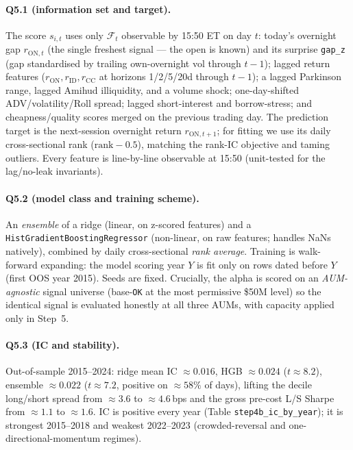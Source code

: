 \documentclass[11pt,a4paper]{article}
\newcommand{\code}[1]{\texttt{#1}}
\newcommand{\icBase}{0.016}
\newcommand{\icHGB}{0.024}
\newcommand{\icEns}{0.022}
\newcommand{\icEnsT}{7.2}
\newcommand{\spreadEns}{4.6}
\begin{document}
\paragraph{Q5.1 (information set and target).} The score $s_{i,t}$ uses only $\mathcal{F}_t$ observable by
15:50 ET on day $t$: today's overnight gap $r_{\mathrm{ON},t}$ (the single freshest signal --- the open is
known) and its surprise \code{gap\_z} (gap standardised by trailing own-overnight vol through $t{-}1$); lagged
return features ($r_{\mathrm{ON}},r_{\mathrm{ID}},r_{\mathrm{CC}}$ at horizons 1/2/5/20d through $t{-}1$); a
lagged Parkinson range, lagged Amihud illiquidity, and a volume shock; one-day-shifted ADV/volatility/Roll
spread; lagged short-interest and borrow-stress; and cheapness/quality scores merged on the previous trading
day. The prediction target is the next-session overnight return $r_{\mathrm{ON},t+1}$; for fitting we use its
daily cross-sectional rank ($\mathrm{rank}-0.5$), matching the rank-IC objective and taming outliers. Every
feature is line-by-line observable at 15:50 (unit-tested for the lag/no-leak invariants).

\paragraph{Q5.2 (model class and training scheme).} An \emph{ensemble} of a ridge (linear, on z-scored
features) and a \code{HistGradientBoostingRegressor} (non-linear, on raw features; handles NaNs natively),
combined by daily cross-sectional \emph{rank average}. Training is walk-forward expanding: the model scoring
year $Y$ is fit only on rows dated before $Y$ (first OOS year 2015). Seeds are fixed. Crucially, the alpha is
scored on an \emph{AUM-agnostic} signal universe (base-\code{OK} at the most permissive \$50M level) so the
identical signal is evaluated honestly at all three AUMs, with capacity applied only in Step~5.

\paragraph{Q5.3 (IC and stability).} Out-of-sample 2015--2024: ridge mean IC $\approx\icBase$, HGB
$\approx\icHGB$ ($t\approx8.2$), ensemble $\approx\icEns$ ($t\approx\icEnsT$, positive on $\approx58\%$ of
days), lifting the decile long/short spread from $\approx3.6$ to $\approx\spreadEns$\,bps and the gross
pre-cost L/S Sharpe from $\approx1.1$ to $\approx1.6$. IC is positive every year (Table
\code{step4b\_ic\_by\_year}); it is strongest 2015--2018 and weakest 2022--2023 (crowded-reversal and
one-directional-momentum regimes).
\end{document}
